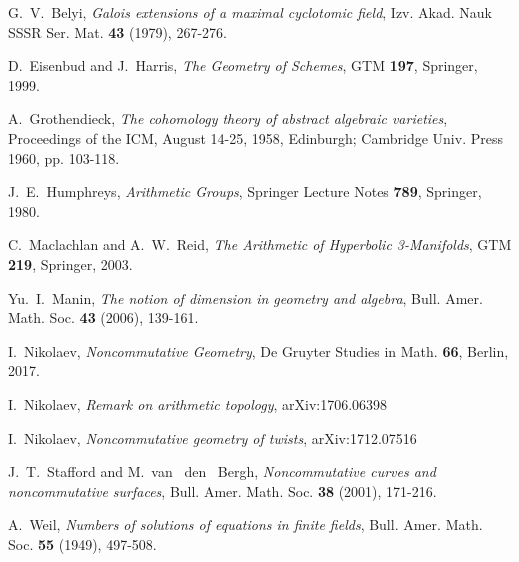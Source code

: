 \documentclass[10pt, reqno]{amsart}
\theoremstyle{definition}
\theoremstyle{remark}
\numberwithin{equation}{section}
\begin{document}

\begin{thebibliography}{99}

G.~V.~Belyi,  \textit{Galois extensions of a maximal cyclotomic field},
Izv. Akad. Nauk SSSR Ser. Mat. \textbf{43} (1979),  267-276.

D.~Eisenbud and J.~Harris, \textit{The Geometry of Schemes}, 
GTM  \textbf{197}, Springer, 1999.


A.~Grothendieck,  
\textit{The cohomology theory of abstract algebraic varieties},  
Proceedings of the ICM,  August 14-25, 1958,  Edinburgh; Cambridge 
Univ. Press  1960, pp. 103-118.  

J.~E.~Humphreys, 
\textit{Arithmetic Groups}, Springer Lecture Notes {\bf 789}, Springer, 1980. 

C.~Maclachlan and A.~W.~Reid, 
\textit{The Arithmetic of Hyperbolic 3-Manifolds}, 
GTM {\bf 219}, Springer, 2003. 


Yu.~I.~Manin,   
\textit{The notion of dimension in geometry and algebra}, 
Bull. Amer. Math. Soc. {\bf 43} (2006), 139-161. 


I.~Nikolaev, \textit{Noncommutative Geometry},
De Gruyter Studies in Math. {\bf 66}, Berlin, 2017.


I.~Nikolaev, \textit{Remark on arithmetic topology}, 
arXiv:1706.06398


I.~Nikolaev, \textit{Noncommutative geometry of twists}, 
arXiv:1712.07516





J.~T.~Stafford and M.~van ~den ~Bergh, \textit{Noncommutative curves and noncommutative
surfaces}, Bull. Amer. Math. Soc. {\bf 38} (2001), 171-216. 


A.~Weil,  \textit{Numbers of solutions of equations in finite fields},   Bull. Amer. Math. Soc. {\bf 55}
(1949), 497-508.  

\end{thebibliography}
\end{document}
